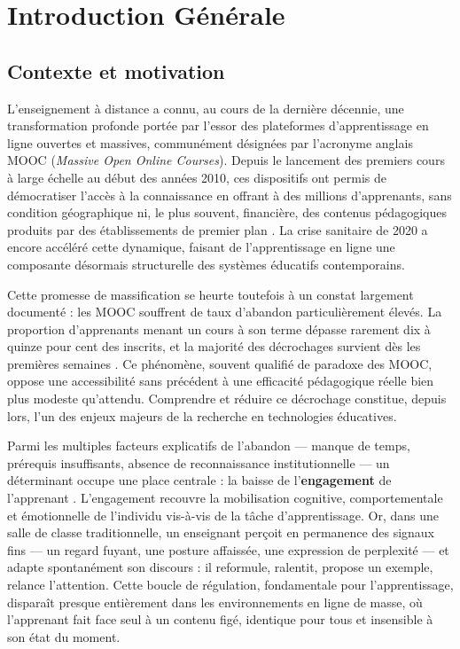 \chapter{Introduction Générale}
\label{chap:introduction}
\minitoc

\section{Contexte et motivation}
\label{sec:contexte}

L'enseignement à distance a connu, au cours de la dernière décennie, une
transformation profonde portée par l'essor des plateformes d'apprentissage en
ligne ouvertes et massives, communément désignées par l'acronyme anglais MOOC
(\emph{Massive Open Online Courses}). Depuis le lancement des premiers cours à
large échelle au début des années 2010, ces dispositifs ont permis de
démocratiser l'accès à la connaissance en offrant à des millions d'apprenants,
sans condition géographique ni, le plus souvent, financière, des contenus
pédagogiques produits par des établissements de premier plan
\cite{breslow2013studying,daniel2012making}. La crise sanitaire de 2020 a encore
accéléré cette dynamique, faisant de l'apprentissage en ligne une composante
désormais structurelle des systèmes éducatifs contemporains.

Cette promesse de massification se heurte toutefois à un constat largement
documenté : les MOOC souffrent de taux d'abandon particulièrement élevés. La
proportion d'apprenants menant un cours à son terme dépasse rarement dix à
quinze pour cent des inscrits, et la majorité des décrochages survient dès les
premières semaines \cite{onah2014dropout,jordan2015massive}. Ce phénomène,
souvent qualifié de paradoxe des MOOC, oppose une accessibilité sans précédent à
une efficacité pédagogique réelle bien plus modeste qu'attendu. Comprendre et
réduire ce décrochage constitue, depuis lors, l'un des enjeux majeurs de la
recherche en technologies éducatives.

Parmi les multiples facteurs explicatifs de l'abandon — manque de temps,
prérequis insuffisants, absence de reconnaissance institutionnelle — un
déterminant occupe une place centrale : la baisse de l'\textbf{engagement} de
l'apprenant \cite{kizilcec2013deconstructing,hew2016promoting}. L'engagement
recouvre la mobilisation cognitive, comportementale et émotionnelle de
l'individu vis-à-vis de la tâche d'apprentissage. Or, dans une salle de classe
traditionnelle, un enseignant perçoit en permanence des signaux fins — un regard
fuyant, une posture affaissée, une expression de perplexité — et adapte
spontanément son discours : il reformule, ralentit, propose un exemple, relance
l'attention. Cette boucle de régulation, fondamentale pour l'apprentissage,
disparaît presque entièrement dans les environnements en ligne de masse, où
l'apprenant fait face seul à un contenu figé, identique pour tous et insensible
à son état du moment.

